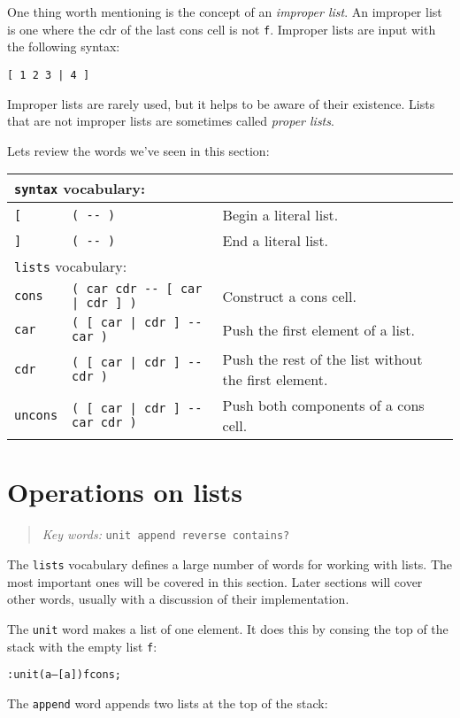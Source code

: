 \documentclass[english]{book}
\newcommand{\chapkeywords}[1]{{\parbox{10cm}{\begin{minipage}[b]{10cm}
\begin{quote}
\emph{Key words:} \texttt{#1}
\end{quote}
\end{minipage}}}}
\newcommand{\wordtable}[1]{{
\begin{tabularx}{12cm}{|l l X|}
#1
\hline
\end{tabularx}}}
\newcommand{\tabvocab}[1]{
\hline
\multicolumn{3}{|l|}{
\rule[-2mm]{0mm}{6mm}
\texttt{#1} vocabulary:}
\\
\hline
}
\begin{document}
One thing worth mentioning is the concept of an \emph{improper list}. An improper list is one where the cdr of the last cons cell is not \texttt{f}. Improper lists are input with the following syntax:

\begin{verbatim}
[ 1 2 3 | 4 ]
\end{verbatim}

Improper lists are rarely used, but it helps to be aware of their existence. Lists that are not improper lists are sometimes called \emph{proper lists}.

Lets review the words we've seen in this section:

\wordtable{
\tabvocab{syntax}
\texttt{{[}}&
\texttt{( -{}- )}&
Begin a literal list.\\
\texttt{{]}}&
\texttt{( -{}- )}&
End a literal list.\\
\tabvocab{lists}
\texttt{cons}&
\texttt{( car cdr -{}- {[} car | cdr {]} )}&
Construct a cons cell.\\
\texttt{car}&
\texttt{( {[} car | cdr {]} -{}- car )}&
Push the first element of a list.\\
\texttt{cdr}&
\texttt{( {[} car | cdr {]} -{}- cdr )}&
Push the rest of the list without the first element.\\
\texttt{uncons}&
\texttt{( {[} car | cdr {]} -{}- car cdr )}&
Push both components of a cons cell.\\}

\section{Operations on lists}

\chapkeywords{unit append reverse contains?}

The \texttt{lists} vocabulary defines a large number of words for working with lists. The most important ones will be covered in this section. Later sections will cover other words, usually with a discussion of their implementation.

The \texttt{unit} word makes a list of one element. It does this by consing the top of the stack with the empty list \texttt{f}:

\begin{alltt}
: unit ( a -- {[} a {]} ) f cons ;
\end{alltt}

The \texttt{append} word appends two lists at the top of the stack:
\end{document}
